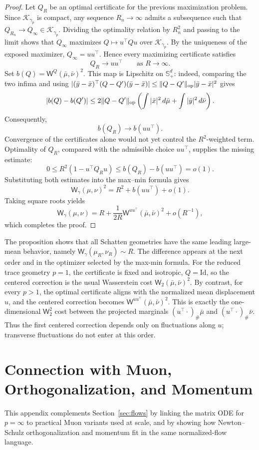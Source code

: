 \documentclass{article}
\newcommand{\Wtwo}{\mathsf{W}_2}
\newcommand{\Wg}{\mathsf{W}_{\gamma}}
\newcommand{\WQ}[1]{\mathsf{W}^{#1}}
\newcommand{\Id}{\mathrm{Id}}
\begin{document}
\begin{proof}
Let $Q_R$ be an optimal certificate for the previous maximization problem.
Since $\mathcal K_{\gamma_p}$ is compact, any sequence $R_n\to\infty$ admits a
subsequence such that $Q_{R_n}\to Q_\infty\in\mathcal K_{\gamma_p}$. Dividing
the optimality relation by $R_n^2$ and passing to the limit shows that
$Q_\infty$ maximizes $Q\mapsto u^\top Q u$ over $\mathcal K_{\gamma_p}$. By
the uniqueness of the exposed maximizer, $Q_\infty=uu^\top$. Hence every
maximizing certificate satisfies
\[
    Q_R\longrightarrow uu^\top
    \qquad\text{as }R\to\infty.
\]
Set $b(Q)=\WQ{Q}(\bar\mu,\bar\nu)^2$. This map is Lipschitz on
$\mathbb S_+^d$: indeed, comparing the two infima and using
$|(\bar y-\bar x)^\top(Q-Q')(\bar y-\bar x)|
\le\|Q-Q'\|_{\rm op}|\bar y-\bar x|^2$ gives
\[
 |b(Q)-b(Q')|
 \le
 2\|Q-Q'\|_{\rm op}
 \left(\int|\bar x|^2\,d\bar\mu
       +\int|\bar y|^2\,d\bar\nu\right).
\]
Consequently,
\[
    b(Q_R)
    \longrightarrow
    b(uu^\top).
\]
Convergence of the certificates alone would not yet control the
$R^2$-weighted term. Optimality of $Q_R$, compared with the admissible choice
$uu^\top$, supplies the missing estimate:
\[
 0\le R^2(1-u^\top Q_Ru)
 \le b(Q_R)-b(uu^\top)=o(1).
\]
Substituting both estimates into the max--min formula gives
\[
    \Wg(\mu,\nu)^2
    =
    R^2+b(uu^\top)+o(1).
\]
Taking square roots yields
\[
    \Wg(\mu,\nu)
    =
    R+\frac{1}{2R}\WQ{uu^\top}(\bar\mu,\bar\nu)^2+o(R^{-1}),
\]
which completes the proof.
\end{proof}

The proposition shows that all Schatten geometries have the same leading
large-mean behavior, namely $\Wg(\mu_R,\nu_R)\sim R$. The difference
appears at the next order and in the optimizer selected by the max-min
formula. For the reduced trace geometry $p=1$, the certificate is fixed and
isotropic, $Q=\Id$, so the centered correction is the usual Wasserstein cost
$\Wtwo(\bar\mu,\bar\nu)^2$. By contrast, for every $p>1$, the optimal
certificate aligns with the normalized mean displacement
$u$, and the centered correction becomes
$\WQ{uu^\top}(\bar\mu,\bar\nu)^2$. This is exactly the one-dimensional
$\Wtwo^2$ cost between the projected marginals
$(u^\top\!\cdot)_\#\bar\mu$ and $(u^\top\!\cdot)_\#\bar\nu$. Thus the first
centered correction depends only on fluctuations along $u$; transverse
fluctuations do not enter at this order.



\section{Connection with Muon, Orthogonalization, and Momentum}
\label{sec:muon-extensions}
This appendix complements Section~\ref{sec:flows} by linking the matrix ODE for $p=\infty$ to practical Muon variants used at scale, and by showing how Newton--Schulz orthogonalization and momentum fit in the same normalized-flow language.
\end{document}
